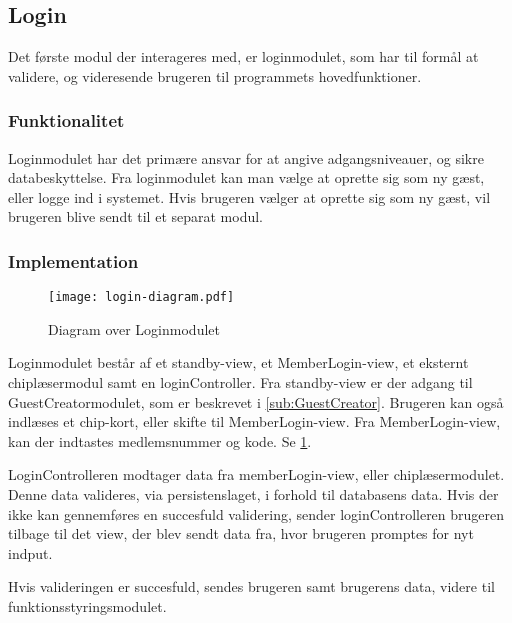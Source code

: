 \subsection{Login}
\label{sub:login}

Det første modul der interageres med, er loginmodulet, som har til formål at validere, og videresende brugeren til programmets hovedfunktioner.

\subsubsection{Funktionalitet}
\label{ssub:login_funktionalitet}

Loginmodulet har det primære ansvar for at angive adgangsniveauer, og sikre databeskyttelse. Fra loginmodulet kan man vælge at oprette sig som ny gæst, eller logge ind i systemet. Hvis brugeren vælger at oprette sig som ny gæst, vil brugeren blive sendt til et separat modul.

\subsubsection{Implementation}
\label{ssub:login_implementation}

\begin{figure}
  \centering
  \texttt{[image: login-diagram.pdf]}
  \caption{Diagram over Loginmodulet} \label{fig:login}
\end{figure}

Loginmodulet består af et standby-view, et MemberLogin-view, et eksternt chiplæsermodul samt en loginController. Fra standby-view er der adgang til GuestCreatormodulet, som er beskrevet i \cref{sub:GuestCreator}. Brugeren kan også indlæses et chip-kort, eller skifte til MemberLogin-view. Fra MemberLogin-view, kan der indtastes medlemsnummer og kode. Se \cref{fig:login}.

LoginControlleren modtager data fra memberLogin-view, eller chiplæsermodulet. Denne data valideres, via persistenslaget, i forhold til databasens data. Hvis der ikke kan gennemføres en succesfuld validering, sender loginControlleren brugeren tilbage til det view, der blev sendt data fra, hvor brugeren promptes for nyt indput.

Hvis valideringen er succesfuld, sendes brugeren samt brugerens data, videre til funktionsstyringsmodulet.
